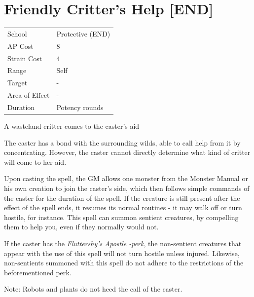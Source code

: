 \documentclass[11pt,a4paper,twocolumn]{book}
\begin{document}
\vfill


\section*{Friendly Critter's Help [END]}
{
	\begin{tabu} to 75mm{| X[l,4] | X[l,7] |}
		\hline
		School 			& Protective (END) 		\\
        AP Cost	      	& 8						\\
        Strain Cost     & 4 					\\
        Range     		& Self 					\\
        Target      	& -						\\
        Area of Effect  & -  	 				\\
        Duration     	& Potency rounds 		\\ \hline
	\end{tabu}
		
}

\medskip

A wasteland critter comes to the caster's aid

The caster has a bond with the surrounding wilds, able to call help from it by concentrating. However, the caster cannot directly determine what kind of critter will come to her aid.

Upon casting the spell, the GM allows one monster from the Monster Manual or his own creation to join the caster's side, which then follows simple commands of the caster for the duration of the spell. If the creature is still present after the effect of the spell ends, it resumes its normal routines - it may walk off or turn hostile, for instance. This spell can summon sentient creatures, by compelling them to help you, even if they normally would not. 

If the caster has the \textit{Fluttershy's Apostle -perk}, the non-sentient creatures that appear with the use of this spell will not turn hostile unless injured. Likewise, non-sentients summoned with this spell do not adhere to the restrictions of the beforementioned perk.

Note: Robots and plants do not heed the call of the caster.
\end{document}
